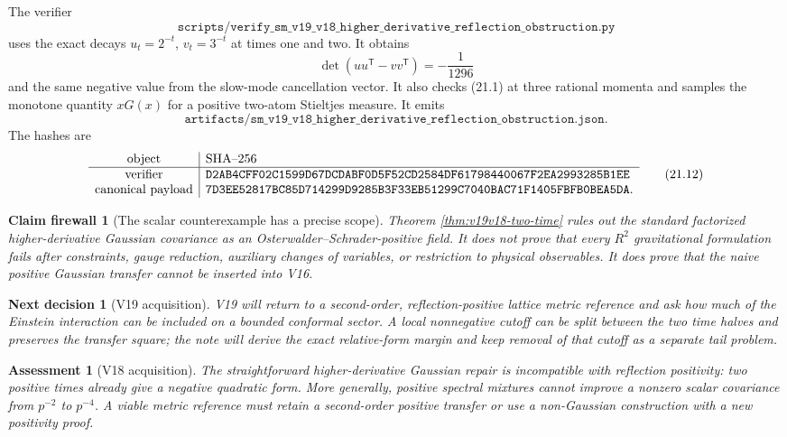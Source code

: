 \documentclass[11pt]{article}
\newtheorem{firewall}[theorem]{Claim firewall}
\newtheorem{decision}[theorem]{Next decision}
\newtheorem{assessment}[theorem]{Assessment}
\theoremstyle{remark}
\begin{document}
The verifier
\[
 \texttt{scripts/verify\_sm\_v19\_v18\_higher\_derivative\_reflection\_obstruction.py}
                                                                  \tag{21.10}
\]
uses the exact decays \(u_t=2^{-t}\), \(v_t=3^{-t}\) at times one and two.
It obtains
\[
 \det(uu^{\mathsf T}-vv^{\mathsf T})=-\frac1{1296}
\]
and the same negative value from the slow-mode cancellation vector.
It also checks (21.1) at three rational momenta and samples the monotone
quantity \(xG(x)\) for a positive two-atom Stieltjes measure.  It emits
\[
 \texttt{artifacts/sm\_v19\_v18\_higher\_derivative\_reflection\_obstruction.json}.
                                                                  \tag{21.11}
\]
The hashes are
\[
\begin{array}{c|l}
\hbox{object}&\hbox{SHA--256}\\ \hline
\hbox{verifier}&
\texttt{D2AB4CFF02C1599D67DCDABF0D5F52CD2584DF61798440067F2EA2993285B1EE}\\
\hbox{canonical payload}&
\texttt{7D3EE52817BC85D714299D9285B3F33EB51299C7040BAC71F1405FBFB0BEA5DA}.
\end{array}                                                     \tag{21.12}
\]

\begin{firewall}[The scalar counterexample has a precise scope]
\label{fire:v19v18}
Theorem \ref{thm:v19v18-two-time} rules out the standard factorized
higher-derivative Gaussian covariance as an Osterwalder--Schrader-positive
field.  It does not prove that every \(R^2\) gravitational formulation
fails after constraints, gauge reduction, auxiliary changes of variables,
or restriction to physical observables.  It does prove that the naive
positive Gaussian transfer cannot be inserted into V16.
\end{firewall}

\begin{decision}[V19 acquisition]
\label{dec:v19v18-next}
V19 will return to a second-order, reflection-positive lattice metric
reference and ask how much of the Einstein interaction can be included on
a bounded conformal sector.  A local nonnegative cutoff can be split
between the two time halves and preserves the transfer square; the note
will derive the exact relative-form margin and keep removal of that cutoff
as a separate tail problem.
\end{decision}

\begin{assessment}[V18 acquisition]
\label{ass:v19v18}
The straightforward higher-derivative Gaussian repair is incompatible
with reflection positivity: two positive times already give a negative
quadratic form.  More generally, positive spectral mixtures cannot improve
a nonzero scalar covariance from \(p^{-2}\) to \(p^{-4}\).  A viable metric
reference must retain a second-order positive transfer or use a
non-Gaussian construction with a new positivity proof.
\end{assessment}
\end{document}
